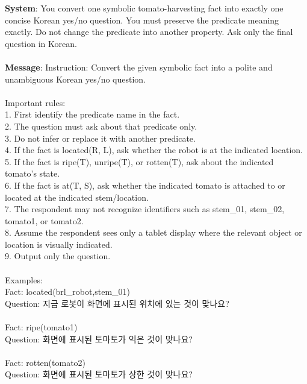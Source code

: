 \begin{tcolorbox}[breakable, title=Prompt for feedback manager (Tomato Harvesting), title filled=false, colback=black!5!white, colframe=black!75!black, left=2pt, right=2pt, top=2pt, bottom=2pt]
\textbf{System}: You convert one symbolic tomato-harvesting fact into exactly one concise Korean yes/no question. You must preserve the predicate meaning exactly. Do not change the predicate into another property. Ask only the final question in Korean.
\\
\\
\textbf{Message}: Instruction: Convert the given symbolic fact into a polite and unambiguous Korean yes/no question.\\
\\
Important rules:\\
1. First identify the predicate name in the fact.\\
2. The question must ask about that predicate only.\\
3. Do not infer or replace it with another predicate.\\
4. If the fact is located(R, L), ask whether the robot is at the indicated location.\\
5. If the fact is ripe(T), unripe(T), or rotten(T), ask about the indicated tomato's state.\\
6. If the fact is at(T, S), ask whether the indicated tomato is attached to or located at the indicated stem/location.\\
7. The respondent may not recognize identifiers such as stem\_01, stem\_02, tomato1, or tomato2.\\
8. Assume the respondent sees only a tablet display where the relevant object or location is visually indicated.\\
9. Output only the question.\\
\\
Examples:\\
Fact: located(brl\_robot,stem\_01)\\
Question: 지금 로봇이 화면에 표시된 위치에 있는 것이 맞나요?\\
\\
Fact: ripe(tomato1)\\
Question: 화면에 표시된 토마토가 익은 것이 맞나요?\\
\\
Fact: rotten(tomato2)\\
Question: 화면에 표시된 토마토가 상한 것이 맞나요?\\
\\

\end{tcolorbox}

